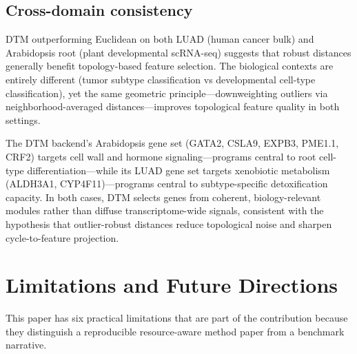 \documentclass[11pt]{article}
\begin{document}
\subsection{Cross-domain consistency}

DTM outperforming Euclidean on both LUAD (human cancer bulk) and Arabidopsis root (plant developmental scRNA-seq) suggests that robust distances generally benefit topology-based feature selection.
The biological contexts are entirely different (tumor subtype classification vs developmental cell-type classification), yet the same geometric principle---downweighting outliers via neighborhood-averaged distances---improves topological feature quality in both settings.

The DTM backend's Arabidopsis gene set (GATA2, CSLA9, EXPB3, PME1.1, CRF2) targets cell wall and hormone signaling---programs central to root cell-type differentiation---while its LUAD gene set targets xenobiotic metabolism (ALDH3A1, CYP4F11)---programs central to subtype-specific detoxification capacity.
In both cases, DTM selects genes from coherent, biology-relevant modules rather than diffuse transcriptome-wide signals, consistent with the hypothesis that outlier-robust distances reduce topological noise and sharpen cycle-to-feature projection.

\section{Limitations and Future Directions}
\label{sec:limitations}

This paper has six practical limitations that are part of the contribution because they distinguish a reproducible resource-aware method paper from a benchmark narrative.
\end{document}
